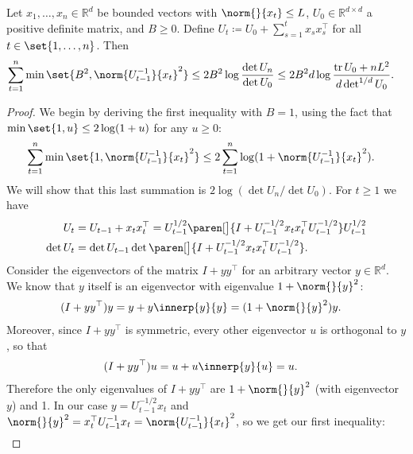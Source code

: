 \documentclass{article}
\newcommand{\defeq}{\coloneq}
\newcommand{\inv}[1]{#1^{-1}}
\newcommand{\Real}{\mathds{R}}
\DeclareMathOperator{\tr}{tr}
\DeclarePairedDelimiter{\paren}()
\providecommand\transp{\top}
\let\transpsymbol\transp
\renewcommand{\transp}[1]{#1^\transpsymbol}
\begin{document}
\begin{lemma}\label{lemma:elliptical-potential}
  Let $x_1,\dotsc,x_n \in \Real^d$ be bounded vectors with
  $\norm{}{x_t} \le L$, $U_0\in\Real^{d\times d}$ a positive definite
  matrix, and $B \ge 0$.  Define
  $U_t \defeq U_0 + \sum_{s=1}^t x_s \transp{x_s}$ for all
  $t\in\set{1,\dotsc,n}$.  Then
  \begin{align*}
    \sum_{t=1}^n\min\set{B^2, \norm{\inv{U_{t-1}}}{x_t}^2}
    &\le 2B^2 \log\frac{\det U_n}{\det U_0}
      \le 2B^2d \log\frac{\tr U_0+nL^2}{d\det^{1/d} U_0}.
  \end{align*}
\end{lemma}

\begin{proof}
  We begin by deriving the first inequality with $B=1$, using the fact
  that $\min\set{1, u} \le 2\log(1+u)$ for any $u \ge 0$:
  \begin{align*}
    \sum_{t=1}^n\min\set{1, \norm{\inv{U_{t-1}}}{x_t}^2}
    &\le 2 \sum_{t=1}^n \log(1 + \norm{\inv{U_{t-1}}}{x_t}^2).
  \end{align*}
  We will show that this last summation is $2\log(\det U_n/\det
  U_0)$.  For $t \ge 1$ we have
  \begin{align*}
    U_t &= U_{t-1} + x_t\transp{x_t}
         = U_{t-1}^{1/2}
         \paren[\big]{I + U_{t-1}^{-1/2}x_t\transp{x_t}U_{t-1}^{-1/2}}
         U_{t-1}^{1/2} \\
    \det U_t &=\det U_{t-1}
              \det\paren[\big]{I + U_{t-1}^{-1/2}x_t\transp{x_t}U_{t-1}^{-1/2}}.
  \end{align*}
  Consider the eigenvectors of the matrix $I+y\transp{y}$ for an
  arbitrary vector $y\in\Real^d$.  We know that $y$ itself is an
  eigenvector with eigenvalue $1+\norm{}{y}^2$:
  \begin{align*}
    (I + y\transp{y})y &= y + y\innerp{y}{y} = (1+\norm{}{y}^2)y.
  \end{align*}
  Moreover, since $I+y\transp{y}$ is symmetric, every other
  eigenvector $u$ is orthogonal to $y$, so that
  \begin{align*}
    (I + y\transp{y})u &= u + u\innerp{y}{u} = u.
  \end{align*}
  Therefore the only eigenvalues of $I+y\transp{y}$ are
  $1+\norm{}{y}^2$ (with eigenvector $y$) and 1.  In our case
  $y = U_{t-1}^{-1/2}x_t$ and
  $\norm{}{y}^2 = \transp{x_t}\inv{U_{t-1}}x_t =
  \norm{\inv{U_{t-1}}}{x_t}^2$, so we get our first inequality:
  \begin{align*}

\end{align*}
\end{proof}
\end{document}
